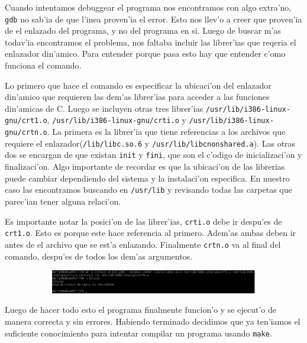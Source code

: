 \documentclass[11pt]{article}
\begin{document}
		Cuando intentamos debuggear el programa nos encontramos con algo extra'no, \texttt{gdb} no sab'ia de que l'inea proven'ia el error. Esto nos llev'o a creer que proven'ia de el enlazado del programa, y no del programa en si. Luego de buscar m'as todav'ia encontramos el problema, nos faltaba incluir las librer'ias que reqeria el enlazador din'amico. Para entender porque pasa esto hay que entender c’omo funciona el comando.
		
		Lo primero que hace el comando es especificar la ubicaci'on del enlazador din'amico que requieren las dem'as librer'ias para acceder a las funciones din'amicas de C. Luego se incluyen otras tres librer'ias \texttt{/usr/lib/i386-linux-gnu/crt1.o}, \texttt{/usr/lib/i386-linux-gnu/crti.o} y \texttt{/usr/lib/i386-linux-gnu/crtn.o}. La primera es la librer'ia que tiene referencias a los archivos que requiere el enlazador(\texttt{/lib/libc.so.6} y \texttt{/usr/lib/libc\textunderscore\/nonshared.a}). Las otras dos se encargan de que existan \texttt{\textunderscore\/init} y \texttt{\textunderscore\/fini}, que son el c'odigo de inicializaci'on y finalizaci'on. Algo importante de recordar es que la ubicaci'on de las librerias puede cambiar dependiendo del sistema y la instalaci'on especifica. En nuestro caso las encontramos buscando en \texttt{/usr/lib} y revisando todas las carpetas que parec'ian tener alguna relaci'on.
	
		Es importante notar la posici'on de las librer'ias, \texttt{crti.o} debe ir despu'es de \texttt{crt1.o}. Esto es porque este hace referencia al primero. Adem'as ambas deben ir antes de el archivo que se est’a enlazando. Finalmente \texttt{crtn.o} va al final del comando, despu'es de todos los dem'as argumentos.
		
		\begin{figure}[H]
			\centering
			\begin{subfigure}[b!]{0.7\linewidth}
				\includegraphics[width=\linewidth]{Images/Seccion 1/S1 parte nueve.PNG}
				\caption*{}
			\end{subfigure}
		\end{figure}
		
		Luego de hacer todo esto el programa finalmente funcion'o y se ejecut'o de manera correcta y sin errores. Habiendo terminado decidimos que ya ten'iamos el suficiente conocimiento para intentar compilar un programa usando \texttt{make}.
		
		
		
		


















\end{document}

